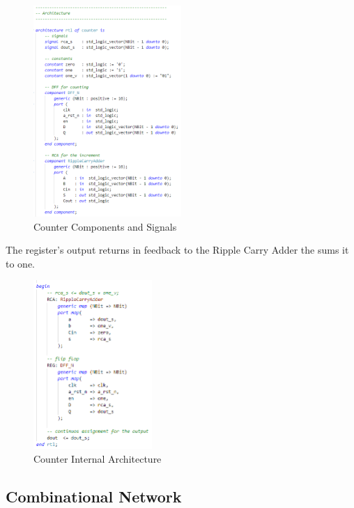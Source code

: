 \begin{figure}[H]
    \centering
    \includegraphics[width=0.5\textwidth]{img/Chapter3/Counter-architecture1.png}
    \caption{Counter Components and Signals}
    \label{fig:CA1}
\end{figure}

The register's output returns in feedback to the Ripple Carry Adder the sums it to one.

\begin{figure}[H]
    \centering
    \includegraphics[width=0.4\textwidth]{img/Chapter3/Counter-architecture2.png}
    \caption{Counter Internal Architecture}
    \label{fig:CA2}
\end{figure}

\subsection{Combinational Network}

